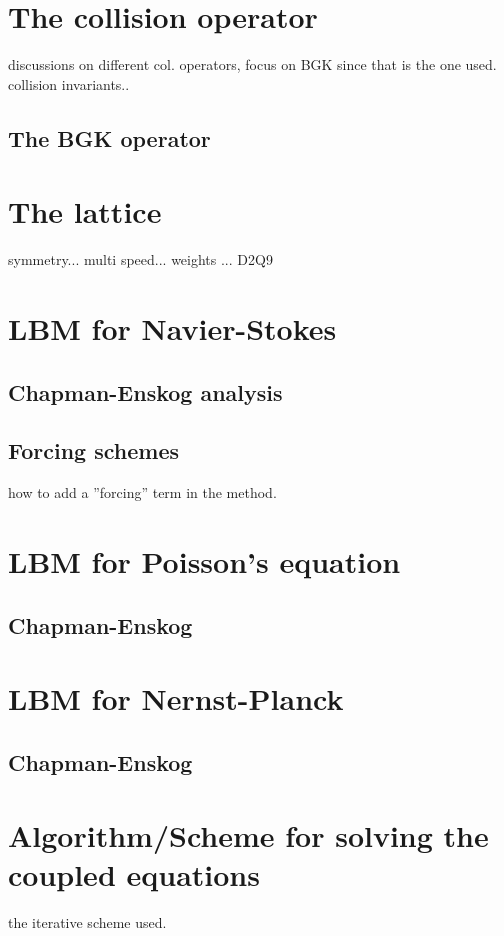 \section{The collision operator}\label{sec:lbm:col}
discussions on different col. operators, focus on BGK since that is
the one used. collision invariants..

\subsection{The BGK operator}

\section{The lattice}\label{sec:lbm:lattice}
symmetry... multi speed... weights ... D2Q9

\section{LBM for Navier-Stokes}
\subsection{Chapman-Enskog analysis}

\subsection{Forcing schemes}
how to add a ''forcing'' term in the method.

\section{LBM for Poisson's equation}
\subsection{Chapman-Enskog}

\section{LBM for Nernst-Planck}
\subsection{Chapman-Enskog}

\section{Algorithm/Scheme for solving the coupled equations}
the iterative scheme used.

